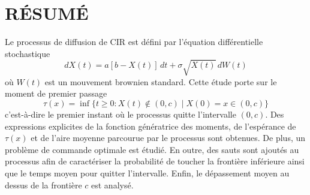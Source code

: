%
\chapter*{RÉSUMÉ}\thispagestyle{headings}

Le processus de diffusion de \ac{CIR} est défini par l'équation différentielle stochastique
\[
dX(t) = a[b - X(t)]\,dt + \sigma \sqrt{X(t)}\,dW(t)
\]
où \(W(t)\) est un mouvement brownien standard. Cette étude porte sur le moment de premier passage
\[
\tau(x) = \inf\{ t \geq 0 : X(t) \notin (0, c) \mid X(0) = x \in (0, c) \}
\]
c'est-à-dire le premier instant où le processus quitte l'intervalle \((0, c)\). Des expressions explicites de la fonction génératrice des moments, de l'espérance de \(\tau(x)\) et de l'aire moyenne parcourue par le processus sont obtenues. De plus, un problème de commande optimale est étudié. En outre, des sauts sont ajoutés au processus afin de caractériser la probabilité de toucher la frontière inférieure ainsi que le temps moyen pour quitter l'intervalle. Enfin, le dépassement moyen au dessus de la frontière $c$ est analysé. 


